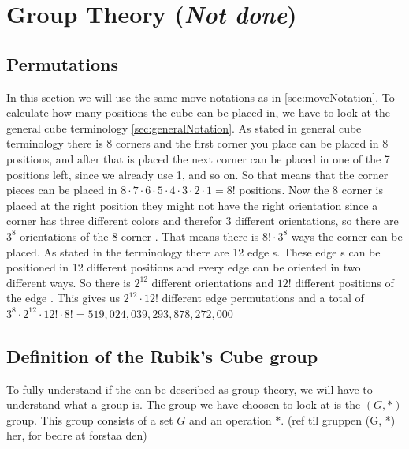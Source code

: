 \chapter{Group Theory (\textit{Not done})}


\section{Permutations}
In this section we will use the same move notations as in \ref{sec:moveNotation}.
To calculate how many positions the cube can be placed in, we have to look at the general cube terminology \ref{sec:generalNotation}.
As stated in general cube terminology there is 8 corners \cpiece{} and the first corner you place can be placed in 8 positions, and after that is placed the next corner \cpiece{} can be placed in one of the 7 positions left, since we already use 1, and so on. So that means that the corner pieces can be placed in $8\cdot7\cdot6\cdot5\cdot4\cdot3\cdot2\cdot1=8!$ positions. Now the 8 corner \cpiece{} is placed at the right position they might not have the right orientation since a corner \cpiece{} has three different colors and therefor 3 different orientations, so there are $3^8$ orientations of the 8 corner \cpiece{}. That means there is $8!\cdot3^8$ ways the corner \cpiece{} can be placed. As stated in the terminology there are 12 edge \cpiece{}s. These edge \cpiece{}s can be positioned in 12 different positions and every edge \cpiece{} can be oriented in two different ways. So there is $2^12$ different orientations and $12!$ different positions of the edge \cpiece{}. This gives us $2^{12}\cdot12!$ different edge permutations and a total of $3^8\cdot2^{12}\cdot12!\cdot8!=519,024,039,293,878,272,000$

\section{Definition of the Rubik's Cube group}
To fully understand if the \rubik{} can be described as group theory, we will have to understand what a group is.
The group we have choosen to look at is the $(G, *)$ group. This group consists of a set $G$ and an operation $*$. (ref til gruppen (G, *) her, for bedre at forstaa den)


